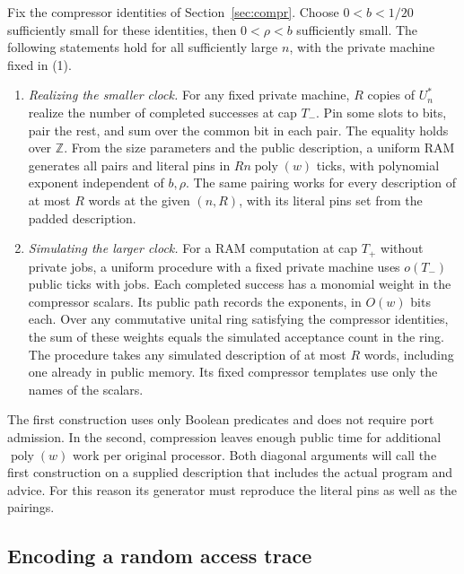 \begin{theorem}\label{thm:gap}
Fix the compressor identities of Section~\ref{sec:compr}. Choose
$0<b<1/20$ sufficiently small for these identities, then $0<\rho<b$
sufficiently small. The following statements hold for all sufficiently
large $n$, with the private machine fixed in (1).
\begin{enumerate}
\item \emph{Realizing the smaller clock.} For any fixed private machine,
$R$ copies of $U_n^*$ realize the number of completed successes at cap
$T_-$. Pin some slots to bits, pair the rest, and sum over the common
bit in each pair. The equality holds over $\mathbb Z$. From the size
parameters and the public description, a uniform RAM generates all
pairs and literal pins in $Rn\operatorname{poly}(w)$ ticks, with
polynomial exponent independent of $b,\rho$. The same pairing works
for every description of at most $R$ words at the given $(n,R)$,
with its literal pins set from the padded description.

\item \emph{Simulating the larger clock.} For a RAM computation at cap
$T_+$ without private jobs, a uniform procedure with a fixed private
machine uses $o(T_-)$ public ticks with jobs. Each completed success
has a monomial weight in the compressor scalars. Its public path
records the exponents, in $O(w)$ bits each. Over any commutative
unital ring satisfying the compressor identities, the sum of these
weights equals the simulated acceptance count in the ring. The
procedure takes any simulated description of at most $R$ words,
including one already in public memory. Its fixed compressor templates
use only the names of the scalars.
\end{enumerate}
\end{theorem}

The first construction uses only Boolean predicates and does not
require port admission. In the second, compression leaves enough
public time for additional $\operatorname{poly}(w)$ work per original
processor. Both diagonal arguments will call the first construction on
a supplied description that includes the actual program and advice.
For this reason its generator must reproduce the literal pins as well
as the pairings.

\subsection{Encoding a random access trace}

